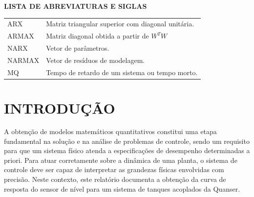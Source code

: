 \documentclass[a4paper,12pt]{article}
\begin{document}
\newpage


\thispagestyle{empty}

\begin{center}
{\large \textbf{LISTA DE ABREVIATURAS E SIGLAS}}
\end{center}

\vspace{3cm}

\begin{tabular}{ l l }
ARX\hspace{1.5cm} & Matriz triangular superior com diagonal unitária.\\
ARMAX\hspace{1.5cm} & Matriz diagonal obtida a partir de $W^{T}W$\\
NARX\hspace{1.5cm}&Vetor de parâmetros.\\
NARMAX\hspace{1.5cm}&Vetor de resíduos de modelagem.\\
MQ\hspace{1.5cm}&Tempo de retardo de um sistema ou tempo morto.\\
\end{tabular}

\newpage


\thispagestyle{empty}

\begin{center}
\listoffigures
\end{center}

\newpage


\thispagestyle{empty}

\begin{center}
\tableofcontents
\end{center}

\newpage


\thispagestyle{main}

\section{INTRODUÇÃO}

\begin{flushleft}
\hspace{4ex}A obtenção de modelos matemáticos quantitativos constitui uma etapa fundamental na solução e na análise de problemas de controle, sendo um requisito para que um sistema físico atenda a especificações de desempenho determinadas a priori. Para atuar corretamente sobre a dinâmica de uma planta, o sistema de controle deve ser capaz de interpretar as grandezas físicas envolvidas com precisão. Neste contexto, este relatório documenta a obtenção da curva de resposta do sensor de nível para um sistema de tanques acoplados da Quanser.
\end{flushleft}
\end{document}
